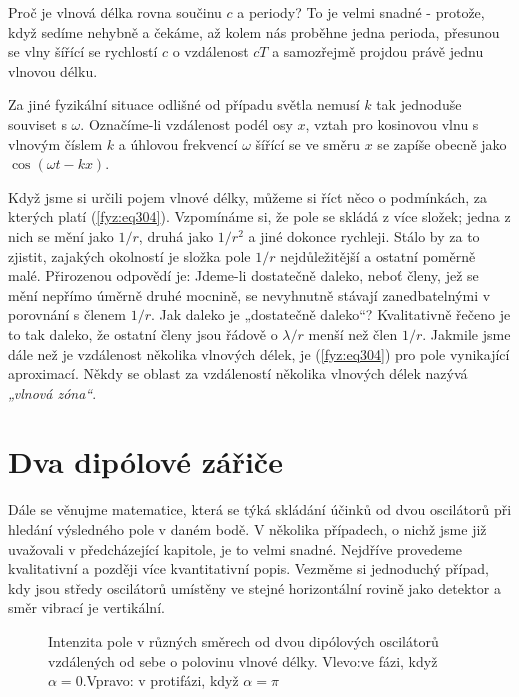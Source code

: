     Proč je vlnová délka rovna součinu \(c\) a periody? To je velmi snadné - protože, když sedíme 
    nehybně a čekáme, až kolem nás proběhne jedna perioda, přesunou se vlny šířící se rychlostí 
    \(c\) o vzdálenost \(cT\) a samozřejmě projdou právě jednu vlnovou délku.
    
    Za jiné fyzikální situace odlišné od případu světla nemusí \(k\) tak jednoduše souviset s 
    \(\omega\). Označíme-li vzdálenost podél osy \(x\), vztah pro kosinovou vlnu s vlnovým číslem 
    \(k\) a úhlovou frekvencí \(\omega\) šířící se ve směru \(x\) se zapíše obecně jako 
    \(\cos(\omega t-kx)\).
    
    Když jsme si určili pojem vlnové délky, můžeme si říct něco o podmínkách, za kterých platí 
    (\ref{fyz:eq304}). Vzpomínáme si, že pole se skládá z více složek; jedna z nich se mění jako 
    \(1/r\), druhá jako \(1/r^2\) a jiné dokonce rychleji. Stálo by za to zjistit, zajakých 
    okolností je složka pole \(1/r\) nejdůležitější a ostatní poměrně malé. Přirozenou odpovědí je: 
    Jdeme-li dostatečně daleko, neboť členy, jež se mění nepřímo úměrně druhé mocnině, se 
    nevyhnutně stávají zanedbatelnými v porovnání s členem \(1/r\). Jak daleko je „dostatečně 
    daleko“? Kvalitativně řečeno je to tak daleko, že ostatní členy jsou řádově o \(\lambda/r\) 
    menší než člen \(1/r\). Jakmile jsme dále než je vzdálenost několika vlnových délek, je 
    (\ref{fyz:eq304}) pro pole vynikající aproximací. Někdy se oblast za vzdáleností několika 
    vlnových délek nazývá \emph{„vlnová zóna“}.
    
  \section{Dva dipólové zářiče}\label{fyz:IchapXXIXsecIV}
    Dále se věnujme matematice, která se týká skládání účinků od dvou oscilátorů při hledání 
    výsledného pole v daném bodě. V několika případech, o nichž jsme již uvažovali v předcházející 
    kapitole, je to velmi snadné. Nejdříve provedeme kvalitativní a později více kvantitativní 
    popis. Vezměme si jednoduchý případ, kdy jsou středy oscilátorů umístěny ve stejné horizontální 
    rovině jako detektor a směr vibrací je vertikální.

    \begin{figure}[ht!]      %
      \centering
      \caption{Intenzita pole v různých směrech od dvou dipólových oscilátorů vzdálených od sebe  o 
               polovinu vlnové délky. Vlevo:ve fázi, když \(\alpha = 0\).Vpravo: v protifázi, když 
               \(\alpha = \pi\) \cite[s.~383]{Feynman01}}
      \label{fyz:fig0236}
    \end{figure}


